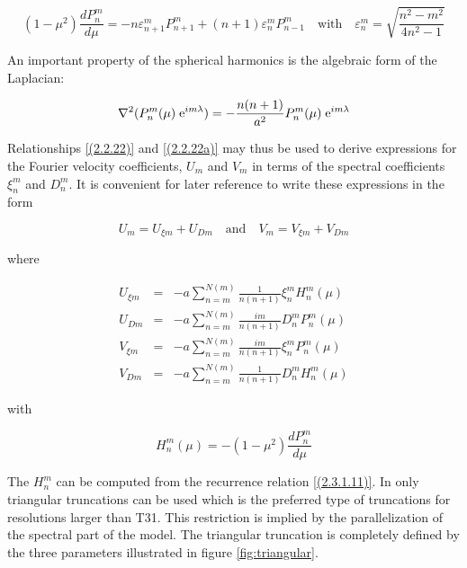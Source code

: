 \begin{equation}
(1-\mu^2)\frac{dP_n^m}{d\mu} = -n\varepsilon_{n+1}^mP_{n+1}^m+(n+1)
\varepsilon_n^mP_{n-1}^m
\quad \mbox{with} \quad
\varepsilon_n^m = \sqrt{\frac{n^2-m^2}{4n^2-1}}
\label{(2.3.1.11)} 
\end{equation}

An important property of the spherical harmonics is the algebraic form
of the Laplacian:

\begin{equation}
\nabla^2(P_n^m(\mu)\;\mbox{e}^{im\lambda}) = -\frac{n(n+1)}{a^2}P_n^m(\mu)\;\mbox{e}^{im\lambda}
\label{(2.3.1.13)}
\end{equation}

Relationships \ref{(2.2.22)} and \ref{(2.2.22a)} may thus be used to
derive expressions for the Fourier velocity coefficients, $U_m$ and
$V_m$ in terms of the spectral coefficients $\xi^m_n$ and $D^m_n$. It
is convenient for later reference to write these expressions in the
form

\begin{equation}
U_m = U_{\xi m} + U_{Dm} \quad \mbox{and} \quad V_m = V_{\xi m} + V_{Dm} 
\label{(2.3.1.14)} 
\end{equation}

where

\begin{eqnarray}
U_{\xi m} & = & -a\sum\limits_{n=m}^{N(m)}\frac{1}{n(n+1)}  \xi_n^mH_n^m(\mu)\\
U_{Dm}    & = & -a\sum\limits_{n=m}^{N(m)}\frac{im}{n(n+1)} D_n^mP_n^m(\mu)\\
V_{\xi m} & = & -a\sum\limits_{n=m}^{N(m)}\frac{im}{n(n+1)} \xi_n^mP_n^m(\mu)\\
V_{Dm}    & = & -a\sum\limits_{n=m}^{N(m)}\frac{1}{n(n+1)}  D_n^mH_n^m(\mu)
\label{(2.3.1.19)}
\end{eqnarray}

with

\begin{equation}
H_n^m(\mu) = -(1-\mu^2)\frac{dP_n^m}{d\mu}
\label{(2.3.1.20)}
\end{equation}

The $H_n^m$ can be computed from the recurrence relation
\ref{(2.3.1.11)}. In \echam{} only triangular truncations can be used
which is the preferred type of truncations for resolutions larger than
T31. This restriction is implied by the parallelization of the
spectral part of the model. The triangular truncation is completely
defined by the three parameters illustrated in figure
\ref{fig:triangular}.

